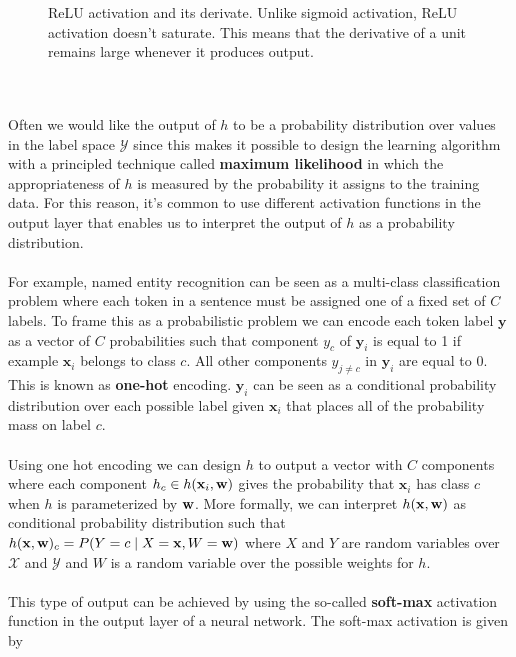 \begin{figure}
	\centering
	
	\caption{ReLU activation and its derivate. Unlike sigmoid activation, ReLU activation doesn't saturate. This means that the derivative of a unit remains large whenever it produces output.}
	\label{relu}
\end{figure}
\\\\
Often we would like the output of $h$ to be a probability distribution over values in the label space $\mathcal{Y}$ since this makes it possible to design the learning algorithm with a principled technique called \textbf{maximum likelihood} in which the appropriateness of $h$ is measured by the probability it assigns to the training data. For this reason, it's common to use different activation functions in the output layer that enables us to interpret the output of $h$ as a probability distribution. 
\\\\
For example, named entity recognition can be seen as a multi-class classification problem where each token in a sentence must be assigned one of a fixed set of $C$ labels. To frame this as a probabilistic problem we can encode each token label $\mathbf{y}$ as a vector of $C$ probabilities such that component $y_c$ of $\mathbf{y}_i$ is equal to 1 if example $\mathbf{x}_i$ belongs to class $c$. All other components $y_{j\neq c}$ in $\mathbf{y}_i$ are equal to 0. This is known as \textbf{one-hot} encoding. $\mathbf{y}_i$ can be seen as a conditional probability distribution over each possible label given $\mathbf{x}_i$ that places all of the probability mass on label $c$.
\\\\
Using one hot encoding we can design $h$ to output a vector with $C$ components where each component $h_c \in h(\mathbf{x}_i, \mathbf{w})$ gives the probability that $\mathbf{x}_i$ has class $c$ when $h$ is parameterized by $\mathbf{w}$. More formally, we can interpret $h(\mathbf{x}, \mathbf{w})$ as conditional probability distribution such that $h(\mathbf{x}, \mathbf{w})_c = P(Y = c \mid X = \mathbf{x}, W = \mathbf{w})$ where $X$ and $Y$ are random variables over $\mathcal{X}$ and $\mathcal{Y}$ and $W$ is a random variable over the possible weights for $h$.
\\\\
This type of output can be achieved by using the so-called \textbf{soft-max} activation function in the output layer of a neural network. The soft-max activation is given by 
